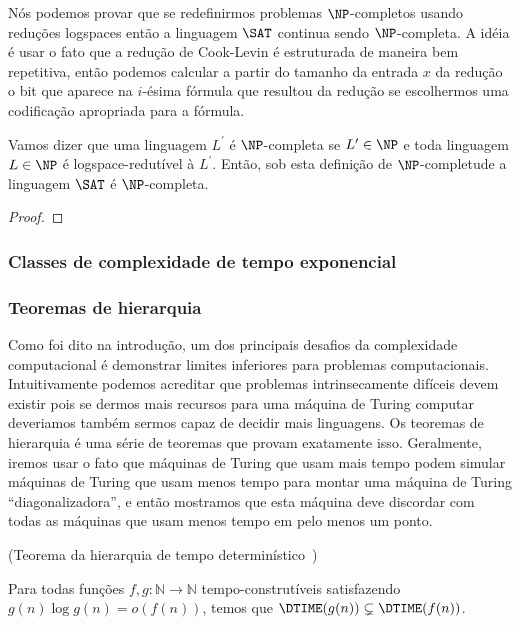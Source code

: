 Nós podemos provar que se redefinirmos problemas $\NP$-completos usando reduções logspaces então a linguagem $\SAT$ continua sendo $\NP$-completa. A idéia é usar o fato que a redução de Cook-Levin é estruturada de maneira bem repetitiva, então podemos calcular a partir do tamanho da entrada $x$ da redução o bit que aparece na $i$-ésima fórmula que resultou da redução se escolhermos uma codificação apropriada para a fórmula.

\begin{prop}  \label{sat_logspace_reduction}

    Vamos dizer que uma linguagem $L^{\prime}$ é $\NP$-completa se $L^{\prime} \in \NP$ e toda linguagem $L \in \NP$ é logspace-redutível à $L^{\prime}$. Então, sob esta definição de $\NP$-completude a linguagem $\SAT$ é $\NP$-completa.

\end{prop}

\begin{proof}

\end{proof}

\subsubsection{Classes de complexidade de tempo exponencial}

\subsubsection{Teoremas de hierarquia}

Como foi dito na introdução, um dos principais desafios da complexidade computacional é demonstrar limites inferiores para problemas computacionais. Intuitivamente podemos acreditar que problemas intrinsecamente difíceis devem existir pois se dermos mais recursos para uma máquina de Turing computar deveriamos também sermos capaz de decidir mais linguagens. Os teoremas de hierarquia é uma série de teoremas que provam exatamente isso. Geralmente, iremos usar o fato que máquinas de Turing que usam mais tempo podem simular máquinas de Turing que usam menos tempo para montar uma máquina de Turing ``diagonalizadora'', e então mostramos que esta máquina deve discordar com todas as máquinas que usam menos tempo em pelo menos um ponto.


\begin{teo} (Teorema da hierarquia de tempo determinístico~\cite{hartmanis1965computational}) \label{dtime_hierarchy}

Para todas funções $f, g: \mathbb{N} \to \mathbb{N}$ tempo-construtíveis satisfazendo $g(n)\log g(n) = o(f(n))$, temos que $\DTIME(g(n)) \subsetneq \DTIME(f(n))$.

\end{teo}

